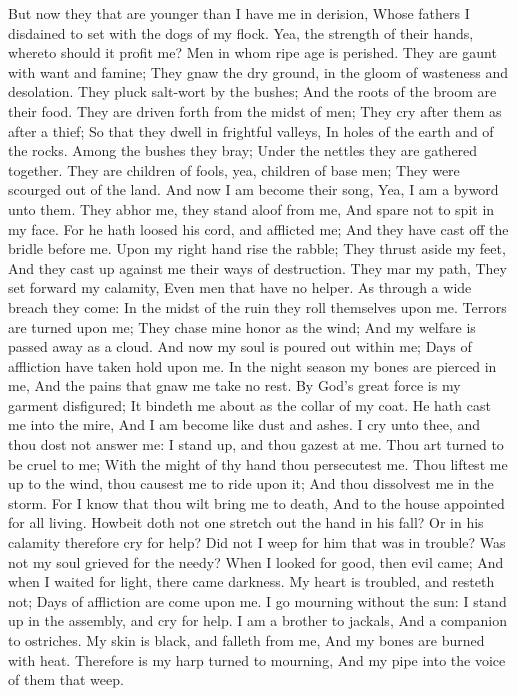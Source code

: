 But now they that are younger than I have me in derision, Whose fathers I disdained to set with the dogs of my flock.  Yea, the strength of their hands, whereto should it profit me? Men in whom ripe age is perished.  They are gaunt with want and famine; They gnaw the dry ground, in the gloom of wasteness and desolation.  They pluck salt-wort by the bushes; And the roots of the broom are their food.  They are driven forth from the midst of men; They cry after them as after a thief;  So that they dwell in frightful valleys, In holes of the earth and of the rocks.  Among the bushes they bray; Under the nettles they are gathered together.  They are children of fools, yea, children of base men; They were scourged out of the land.  And now I am become their song, Yea, I am a byword unto them.  They abhor me, they stand aloof from me, And spare not to spit in my face.  For he hath loosed his cord, and afflicted me; And they have cast off the bridle before me.  Upon my right hand rise the rabble; They thrust aside my feet, And they cast up against me their ways of destruction.  They mar my path, They set forward my calamity, Even men that have no helper.  As through a wide breach they come: In the midst of the ruin they roll themselves upon me.  Terrors are turned upon me; They chase mine honor as the wind; And my welfare is passed away as a cloud.  And now my soul is poured out within me; Days of affliction have taken hold upon me.  In the night season my bones are pierced in me, And the pains that gnaw me take no rest.  By God’s great force is my garment disfigured; It bindeth me about as the collar of my coat.  He hath cast me into the mire, And I am become like dust and ashes.  I cry unto thee, and thou dost not answer me: I stand up, and thou gazest at me.  Thou art turned to be cruel to me; With the might of thy hand thou persecutest me.  Thou liftest me up to the wind, thou causest me to ride upon it; And thou dissolvest me in the storm.  For I know that thou wilt bring me to death, And to the house appointed for all living.  Howbeit doth not one stretch out the hand in his fall? Or in his calamity therefore cry for help?  Did not I weep for him that was in trouble? Was not my soul grieved for the needy?  When I looked for good, then evil came; And when I waited for light, there came darkness.  My heart is troubled, and resteth not; Days of affliction are come upon me.  I go mourning without the sun: I stand up in the assembly, and cry for help.  I am a brother to jackals, And a companion to ostriches.  My skin is black, and falleth from me, And my bones are burned with heat.  Therefore is my harp turned to mourning, And my pipe into the voice of them that weep. 

